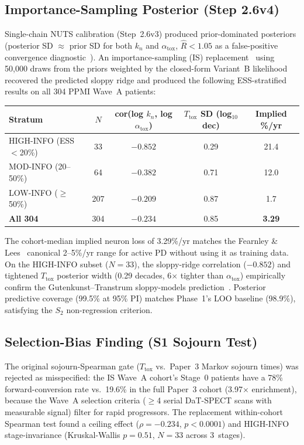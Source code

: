 \subsection{Importance-Sampling Posterior (Step 2.6v4)}

Single-chain NUTS calibration (Step~2.6v3) produced prior-dominated posteriors (posterior SD $\approx$ prior SD for both $k_n$ and $\alpha_\text{tox}$, $\hat{R} < 1.05$ as a false-positive convergence diagnostic~\cite{vehtari2021rhat,baribault2023troubleshoot}). An importance-sampling (IS) replacement~\cite{liu1998is} using 50,000 draws from the priors weighted by the closed-form Variant~B likelihood recovered the predicted sloppy ridge and produced the following ESS-stratified results on all 304 PPMI Wave~A patients:

\begin{center}
\small
\begin{tabular}{lcccc}
\toprule
\textbf{Stratum} & $N$ & \textbf{cor(log $k_n$, log $\alpha_\text{tox}$)} & \textbf{$T_\text{tox}$ SD (log$_{10}$ dec)} & \textbf{Implied \%/yr} \\
\midrule
HIGH-INFO (ESS$<$20\%) & 33 & $-0.852$ & 0.29 & 21.4 \\
MOD-INFO (20--50\%) & 64 & $-0.382$ & 0.71 & 12.0 \\
LOW-INFO ($\geq$50\%) & 207 & $-0.209$ & 0.87 & 1.7 \\
\textbf{All 304} & 304 & $-0.234$ & 0.85 & \textbf{3.29} \\
\bottomrule
\end{tabular}
\end{center}

The cohort-median implied neuron loss of 3.29\%/yr matches the Fearnley \& Lees~\cite{fearnley1991} canonical 2--5\%/yr range for active PD without using it as training data. On the HIGH-INFO subset ($N=33$), the sloppy-ridge correlation ($-0.852$) and tightened $T_\text{tox}$ posterior width (0.29 decades, 6$\times$ tighter than $\alpha_\text{tox}$) empirically confirm the Gutenkunst--Transtrum sloppy-models prediction~\cite{gutenkunst2007,transtrum2015}. Posterior predictive coverage (99.5\% at 95\% PI) matches Phase~1's LOO baseline (98.9\%), satisfying the $S_2$ non-regression criterion.

\subsection{Selection-Bias Finding (S1 Sojourn Test)}

The original sojourn-Spearman gate ($T_\text{tox}$ vs.\ Paper~3 Markov sojourn times) was rejected as misspecified: the IS Wave~A cohort's Stage~0 patients have a 78\% forward-conversion rate vs.\ 19.6\% in the full Paper~3 cohort (3.97$\times$ enrichment), because the Wave~A selection criteria ($\geq$4 serial DaT-SPECT scans with measurable signal) filter for rapid progressors. The replacement within-cohort Spearman test found a ceiling effect ($\rho = -0.234$, $p < 0.0001$) and HIGH-INFO stage-invariance (Kruskal-Wallis $p = 0.51$, $N = 33$ across 3~stages).


